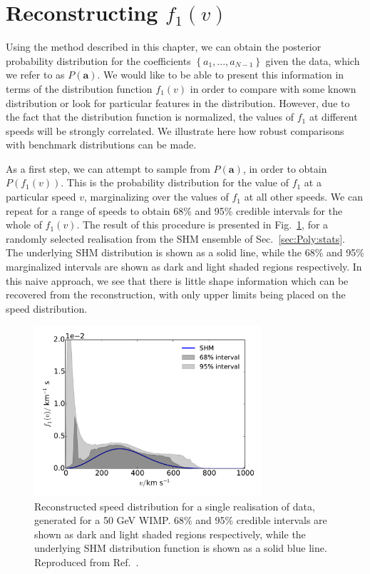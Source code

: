 \section{Reconstructing $f_1(v)$}
\label{sec:Poly:Recon}

Using the method described in this chapter, we can obtain the posterior probability distribution for the coefficients $\left\{ a_1, ..., a_{N-1}\right\}$ given the data, which we refer to as $P(\textbf{a})$. We would like to be able to present this information in terms of the distribution function $f_1(v)$ in order to compare with some known distribution or look for particular features in the distribution. However, due to the fact that the distribution function is normalized, the values of $f_1$ at different speeds will be strongly correlated. We illustrate here how robust comparisons with benchmark distributions can be made.

As a first step, we can attempt to sample from $P(\textbf{a})$, in order to obtain $P(f_1(v))$. This is the probability distribution for the value of $f_1$ at a particular speed $v$, marginalizing over the values of $f_1$ at all other speeds. We can repeat for a range of speeds to obtain 68\% and 95\% credible intervals for the whole of $f_1(v)$. The result of this procedure is presented in Fig.~\ref{fig:Poly:f}, for a randomly selected realisation from the SHM ensemble of Sec.~\ref{sec:Poly:stats}. The underlying SHM distribution is shown as a solid line, while the 68\% and 95\% marginalized intervals are shown as dark and light shaded regions respectively. In this naive approach, we see that there is little shape information which can be recovered from the reconstruction, with only upper limits being placed on the speed distribution.

\begin{figure}[t]
\centering
  \includegraphics[width=0.75\textwidth]{Poly/f_SHM.pdf}
  \caption[Reconstructed speed distribution for a single realisation of data using the polynomial $\ln f(v)$ parametrisation]{Reconstructed speed distribution for a single realisation of data, generated for a 50 GeV WIMP. 68\% and 95\% credible intervals are shown as dark and light shaded regions respectively, while the underlying SHM distribution function is shown as a solid blue line. Reproduced from Ref.~\cite{Kavanagh:2014}.}
  \label{fig:Poly:f}
\end{figure}



